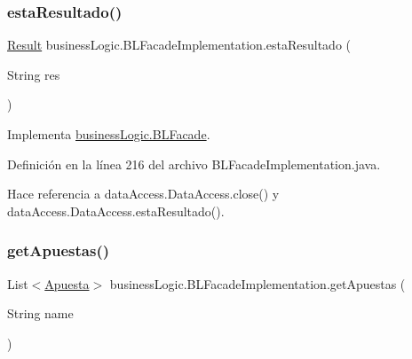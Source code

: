 \subsubsection{\texorpdfstring{estaResultado()}{estaResultado()}}
{\footnotesize\ttfamily \mbox{\hyperlink{classdomain_1_1Result}{Result}} business\+Logic.\+B\+L\+Facade\+Implementation.\+esta\+Resultado (\begin{DoxyParamCaption}\item[{String}]{res }\end{DoxyParamCaption})}



Implementa \mbox{\hyperlink{interfacebusinessLogic_1_1BLFacade_a3115bea528677d182ed5725eacbdf13c}{business\+Logic.\+B\+L\+Facade}}.



Definición en la línea 216 del archivo B\+L\+Facade\+Implementation.\+java.


\begin{DoxyCode}{0}

\end{DoxyCode}


Hace referencia a data\+Access.\+Data\+Access.\+close() y data\+Access.\+Data\+Access.\+esta\+Resultado().

\mbox{\label{classbusinessLogic_1_1BLFacadeImplementation_afbf2b534e813dc7344214b5b8d6ca4de}} 
\subsubsection{\texorpdfstring{getApuestas()}{getApuestas()}}
{\footnotesize\ttfamily List$<$\mbox{\hyperlink{classdomain_1_1Apuesta}{Apuesta}}$>$ business\+Logic.\+B\+L\+Facade\+Implementation.\+get\+Apuestas (\begin{DoxyParamCaption}\item[{String}]{name }\end{DoxyParamCaption})}



